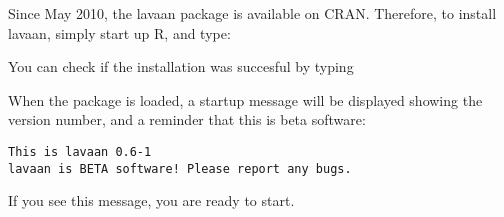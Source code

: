 Since May 2010, the lavaan package is available on CRAN. Therefore, to
install lavaan, simply start up R, and type:

\begin{Shaded}
\begin{Highlighting}[]
\NormalTok{(}\NormalTok{, }\NormalTok{)}
\end{Highlighting}
\end{Shaded}

You can check if the installation was succesful by typing

\begin{Shaded}
\begin{Highlighting}[]
\end{Highlighting}
\end{Shaded}

When the package is loaded, a startup message will be displayed showing
the version number, and a reminder that this is beta software:

\begin{verbatim}
This is lavaan 0.6-1
lavaan is BETA software! Please report any bugs.
\end{verbatim}

If you see this message, you are ready to start.
